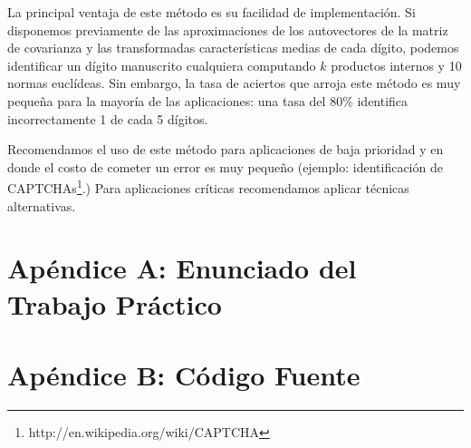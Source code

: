 \documentclass[a4paper,10pt,twoside]{article}
\begin{document}
La principal ventaja de este método es su facilidad de implementación. Si disponemos previamente de las aproximaciones de los autovectores de la matriz de covarianza y las transformadas características medias de cada dígito, podemos identificar un dígito manuscrito cualquiera computando $k$ productos internos y 10 normas euclídeas. Sin embargo, la tasa de aciertos que arroja este método es muy pequeña para la mayoría de las aplicaciones: una tasa del 80\% identifica incorrectamente 1 de cada 5 dígitos.

Recomendamos el uso de este método para aplicaciones de baja prioridad y en donde el costo de cometer un error es muy pequeño (ejemplo: identificación de CAPTCHAs\footnote{http://en.wikipedia.org/wiki/CAPTCHA}.) Para aplicaciones críticas recomendamos aplicar técnicas alternativas.




\newpage

\section{Apéndice A: Enunciado del Trabajo Práctico}





\newpage

\section{Apéndice B: Código Fuente}









\end{document}

